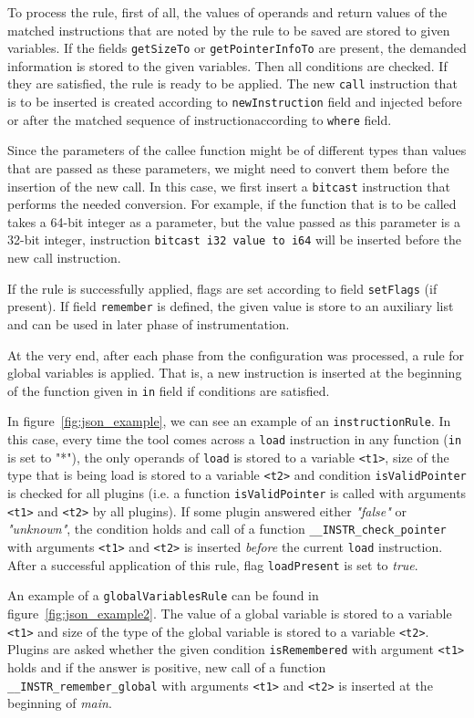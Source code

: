To process the rule, first of all, the values of operands and return values of
the matched instructions that are noted by the rule to be saved are stored to
given variables. If the fields \texttt{getSizeTo} or \texttt{getPointerInfoTo}
are present, the demanded information is stored to the given variables. Then
all conditions are checked. If they are satisfied, the rule is ready to be
applied. The new \texttt{call} instruction that is to be inserted is created
according to \texttt{newInstruction} field and injected before or after the
matched sequence of instructionaccording to \texttt{where} field.

Since the parameters of the callee function might be of different types than
values that are passed as these parameters, we might need to convert them
before the insertion of the new call. In this case, we first insert a
\texttt{bitcast} instruction that performs the needed conversion. For example,
if the function that is to be called takes a 64-bit integer as a parameter, but
the value passed as this parameter is a 32-bit integer, instruction
\texttt{bitcast i32 value to i64} will be inserted before the new call
instruction.

If the rule is successfully applied, flags are set according to field
\texttt{setFlags} (if present). If field \texttt{remember} is defined, the
given value is store to an auxiliary list and can be used in later phase of
instrumentation.

At the very end, after each phase from the configuration was processed, a rule
for global variables is applied. That is, a new instruction is inserted at the
beginning of the function given in \texttt{in} field if conditions are
satisfied.


In figure~\ref{fig:json_example}, we can see an example of an
\texttt{instructionRule}. In this case, every time the tool comes across a
\texttt{load} instruction in any function (\texttt{in} is set to "*"), the only
operands of \texttt{load} is stored to a variable \texttt{<t1>}, size of the
type that is being load is stored to a variable \texttt{<t2>} and condition
\texttt{isValidPointer} is checked for all plugins (i.e. a function
\texttt{isValidPointer} is called with arguments \texttt{<t1>} and
\texttt{<t2>} by all plugins). If some plugin answered either \emph{"false"} or
\emph{"unknown"}, the condition holds and call of a function
\texttt{\_\_INSTR\_check\_pointer} with arguments \texttt{<t1>} and
\texttt{<t2>} is inserted \emph{before} the current \texttt{load} instruction.
After a successful application of this rule, flag \texttt{loadPresent} is set
to \emph{true}.

An example of a \texttt{globalVariablesRule} can be found in
figure~\ref{fig:json_example2}. The value of a global variable is stored to a
variable \texttt{<t1>} and size of the type of the global variable is stored to
a variable \texttt{<t2>}. Plugins are asked whether the given condition
\texttt{isRemembered} with argument \texttt{<t1>} holds and if the answer is
positive, new call of a function \texttt{\_\_INSTR\_remember\_global} with
arguments \texttt{<t1>} and \texttt{<t2>} is inserted at the beginning of
\emph{main}.

